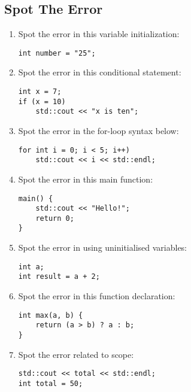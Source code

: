 \documentclass[a4paper,12pt]{article}
\begin{document}
\newpage

\subsection{Spot The Error}

\begin{enumerate}
    \item Spot the error in this variable initialization:
\begin{lstlisting}
int number = "25";
\end{lstlisting}

    \item Spot the error in this conditional statement:
\begin{lstlisting}
int x = 7;
if (x = 10)
    std::cout << "x is ten";
\end{lstlisting}

    \item Spot the error in the for-loop syntax below:
\begin{lstlisting}
for int i = 0; i < 5; i++)
    std::cout << i << std::endl;
\end{lstlisting}

    \item Spot the error in this main function:
\begin{lstlisting}
main() {
    std::cout << "Hello!";
    return 0;
}
\end{lstlisting}

    \item Spot the error in using uninitialised variables:
\begin{lstlisting}
int a;
int result = a + 2;
\end{lstlisting}

    \item Spot the error in this function declaration:
\begin{lstlisting}
int max(a, b) {
    return (a > b) ? a : b;
}
\end{lstlisting}

    \item Spot the error related to scope:
\begin{lstlisting}
std::cout << total << std::endl;
int total = 50;
\end{lstlisting}

\end{enumerate}
\end{document}
